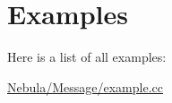 \section{\-Examples}
\-Here is a list of all examples\-:\begin{DoxyCompactItemize}
\item 
\hyperlink{Nebula_2Message_2example_8cc-example}{\-Nebula/\-Message/example.\-cc}
\end{DoxyCompactItemize}
